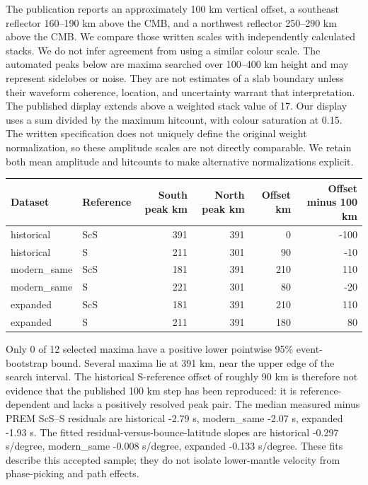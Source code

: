 \documentclass[10pt]{article}
\begin{document}
The publication reports an approximately 100 km vertical offset, a southeast
reflector 160--190 km above the CMB, and a northwest reflector 250--290 km above
the CMB. We compare those written scales with independently calculated stacks.
We do not infer agreement from using a similar colour scale. The automated peaks
below are maxima searched over 100--400 km height and may represent sidelobes or
noise. They are not estimates of a slab boundary unless their waveform coherence,
location, and uncertainty warrant that interpretation.
The published display extends above a weighted stack value of 17. Our display
uses a sum divided by the maximum hitcount, with colour saturation at 0.15.
The written specification does not uniquely define the original weight
normalization, so these amplitude scales are not directly comparable. We retain
both mean amplitude and hitcounts to make alternative normalizations explicit.
\begin{center}\begin{tabular}{llrrrr}\toprule
Dataset & Reference & South peak km & North peak km & Offset km & Offset minus 100 km\\\midrule
historical & ScS & 391 & 391 & 0 & -100 \\
historical & S & 211 & 301 & 90 & -10 \\
modern\_same & ScS & 181 & 391 & 210 & 110 \\
modern\_same & S & 221 & 301 & 80 & -20 \\
expanded & ScS & 181 & 391 & 210 & 110 \\
expanded & S & 211 & 391 & 180 & 80 \\
\bottomrule\end{tabular}\end{center}
Only 0 of 12 selected maxima have a positive lower pointwise 95\% event-bootstrap bound. Several maxima lie at 391 km, near the upper edge of the search interval. The historical S-reference offset of roughly 90 km is therefore not evidence that the published 100 km step has been reproduced: it is reference-dependent and lacks a positively resolved peak pair.
The median measured minus PREM ScS--S residuals are historical -2.79 s, modern\_same -2.07 s, expanded -1.93 s. The fitted residual-versus-bounce-latitude slopes are historical -0.297 s/degree, modern\_same -0.008 s/degree, expanded -0.133 s/degree. These fits describe this accepted sample; they do not isolate lower-mantle velocity from phase-picking and path effects.


\end{document}
